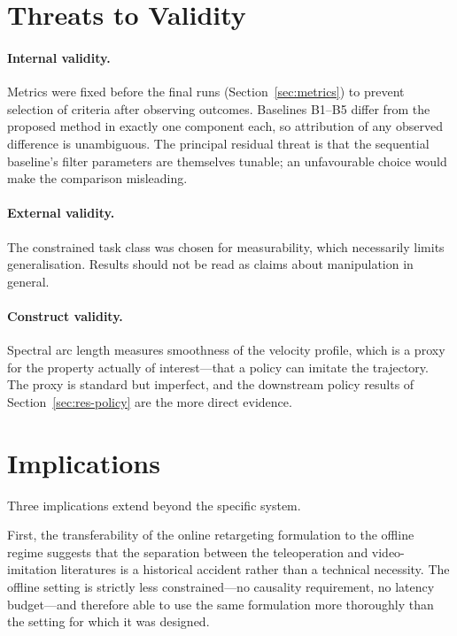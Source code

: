 \section{Threats to Validity}
\label{sec:validity}

\paragraph{Internal validity.} Metrics were fixed before the final runs
(Section~\ref{sec:metrics}) to prevent selection of criteria after observing
outcomes. Baselines B1--B5 differ from the proposed method in exactly one
component each, so attribution of any observed difference is unambiguous. The
principal residual threat is that the sequential baseline's filter parameters
are themselves tunable; an unfavourable choice would make the comparison
misleading. 

\paragraph{External validity.} The constrained task class was chosen for
measurability, which necessarily limits generalisation. Results should not be
read as claims about manipulation in general.

\paragraph{Construct validity.} Spectral arc length measures smoothness of the
velocity profile, which is a proxy for the property actually of interest---that
a policy can imitate the trajectory. The proxy is standard but imperfect, and
the downstream policy results of Section~\ref{sec:res-policy} are the more
direct evidence.

\section{Implications}
\label{sec:implications}

Three implications extend beyond the specific system.

First, the transferability of the online retargeting formulation to the offline
regime suggests that the separation between the teleoperation and
video-imitation literatures is a historical accident rather than a technical
necessity. The offline setting is strictly less constrained---no causality
requirement, no latency budget---and therefore able to use the same formulation
more thoroughly than the setting for which it was designed.

